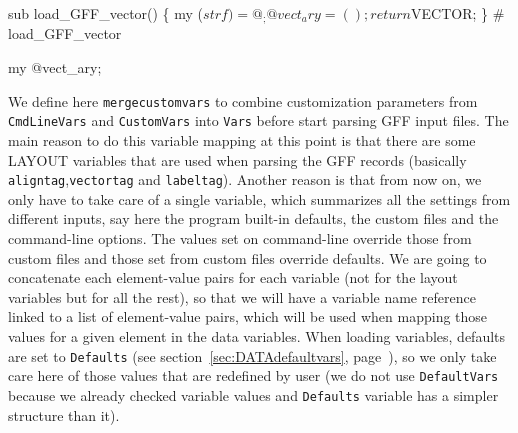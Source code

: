 \documentclass[11pt]{article}
\def\nwendcode{\endtrivlist \endgroup} %
\let\nwdocspar=\par                    %
\begin{document}
 \label{sec:loadvector}

\label{todo:EVA}
\nwenddocs{}%
%
%
%
%
\nwdocspar
\nwenddocs{}%
%
\nwdocspar
\todo{ \item \todoEVA } %

\nwenddocs{}\plusendmoddef
sub load_GFF_vector() \{
    my ($strf) = @_;
    @vect_ary = ();
    return $VECTOR;
\} # load_GFF_vector
\eatline
{}\nwendcode{}\nwdocspar
\nwenddocs{}\plusendmoddef
my @vect_ary;
\nwendcode{}\nwdocspar


\newpage


\nwenddocs{}%
%
\nwdocspar


We define here {\tt{}\protect{}merge{}custom{}vars} to combine customization
parameters from {\tt{}{}CmdLineVars} and {\tt{}{}CustomVars} into {\tt{}{}Vars}
before start parsing GFF input files. The main reason to do this
variable mapping at this point is that there are some LAYOUT variables
that are used when parsing the GFF records (basically
{\tt{}align{}tag},{\tt{}vector{}tag} and {\tt{}label{}tag}). Another reason is
that from now on, we only have to take care of a single variable,
which summarizes all the settings from different inputs, say here the
program built-in defaults, the custom files and the command-line
options. The values set on command-line override those from custom
files and those set from custom files override defaults. We are going
to concatenate each element-value pairs for each variable (not for the
layout variables but for all the rest), so that we will have a
variable name reference linked to a list of element-value pairs, which
will be used when mapping those values for a given element in the data
variables. When loading variables, defaults are set to {\tt{}{}Defaults}
(see section~\ref{sec:DATAdefaultvars},
page~\pageref{sec:DATAdefaultvars}), so we only take care here of
those values that are redefined by user (we do not use {\tt{}{}DefaultVars} because we already checked variable values and {\tt{}{}Defaults} variable has a simpler structure than it).
\end{document}
